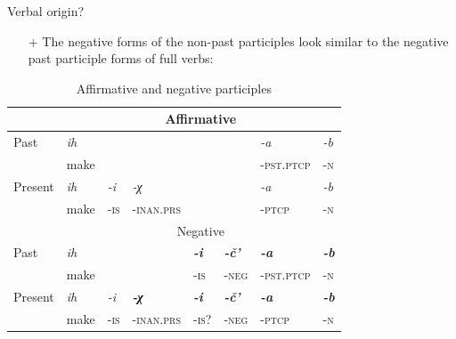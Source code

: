 \begin{frame}{Verbal origin?}
\begin{itemize}
   \item[{$+$}] The negative forms of the non-past participles look similar to the negative past participle forms of full verbs:
   \end{itemize} %
   
\begin{table}[h]
\caption{Affirmative and negative participles}
\label{tab:negptcp}
\begin{tabular}{l|lllllll}
\cline{2-8}
        & \multicolumn{7}{c|}{Affirmative}                                                                                                              \\ \hline
Past    & \textit{ih} & \textit{}   & \textit{}            & \textit{}            & \textit{}             & \textit{-a}          & \textit{-b}          \\
        & make        &             &                      &                      &                       & -\textsc{pst.ptcp}            & -\textsc{n}                   \\ \hline
Present & \textit{ih} & \textit{-i} & \textit{-χ}          & \textit{}            & \textit{}             & \textit{-a}          & \textit{-b}          \\
        & make        & -\textsc{is}         & -\textsc{inan.prs}            &                      &                       & -\textsc{ptcp}                & -\textsc{n}                   \\ \cline{2-8} 
        & \multicolumn{7}{c|}{Negative}                                                                                                                 \\ \hline
Past    & \textit{ih} & \textit{}   & \textit{}            & \textit{\textbf{-i}} & \textit{\textbf{-č'}} & \textit{\textbf{-a}} & \textit{\textbf{-b}} \\
        & make        &             &                      & -\textsc{is}                  & -\textsc{neg}                  & -\textsc{pst.ptcp}            & -\textsc{n}                   \\ \hline
Present & \textit{ih} & \textit{-i} & \textit{\textbf{-χ}} & \textit{\textbf{-i}} & \textit{\textbf{-č'}} & \textit{\textbf{-a}} & \textit{\textbf{-b}} \\
        & make        & -\textsc{is}         & -\textsc{inan.prs}            & -\textsc{is?}                 & -\textsc{neg}                  & -\textsc{ptcp}                & -\textsc{n}                  
\end{tabular}
\end{table}
\end{frame}

